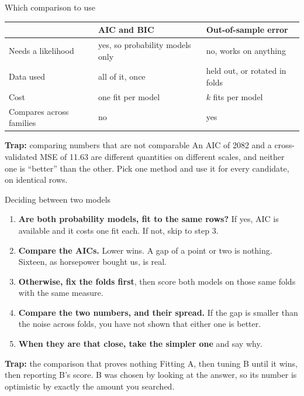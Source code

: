 \documentclass[aspectratio=169]{beamer}
\newenvironment{trap}[1]{\begin{alertblock}{\textbf{Trap:} #1}}{\end{alertblock}}
\begin{document}
\begin{frame}{Which comparison to use}
\begin{center}\small
\begin{tabular}{L{0.26\textwidth} L{0.30\textwidth} L{0.32\textwidth}}
\toprule
 & \textbf{AIC and BIC} & \textbf{Out-of-sample error} \\
\midrule
Needs a likelihood & yes, so probability models only & no, works on anything \\
Data used & all of it, once & held out, or rotated in folds \\
Cost & one fit per model & $k$ fits per model \\
Compares across families & no & yes \\
\bottomrule
\end{tabular}
\end{center}
\begin{trap}{comparing numbers that are not comparable}
An AIC of 2082 and a cross-validated MSE of 11.63 are different quantities on different scales,
and neither one is ``better'' than the other. Pick one method and use it for every candidate, on
identical rows.
\end{trap}
\end{frame}

\begin{frame}{Deciding between two models}
\begin{enumerate}
  \item \textbf{Are both probability models, fit to the same rows?} If yes, AIC is available and
        it costs one fit each. If not, skip to step 3.
  \item \textbf{Compare the AICs.} Lower wins. A gap of a point or two is nothing. Sixteen, as
        horsepower bought us, is real.
  \item \textbf{Otherwise, fix the folds first}, then score both models on those same folds with
        the same measure.
  \item \textbf{Compare the two numbers, and their spread.} If the gap is smaller than the noise
        across folds, you have not shown that either one is better.
  \item \textbf{When they are that close, take the simpler one} and say why.
\end{enumerate}
\begin{trap}{the comparison that proves nothing}
Fitting A, then tuning B until it wins, then reporting B's score. B was chosen by looking at the
answer, so its number is optimistic by exactly the amount you searched.
\end{trap}
\end{frame}
\end{document}
